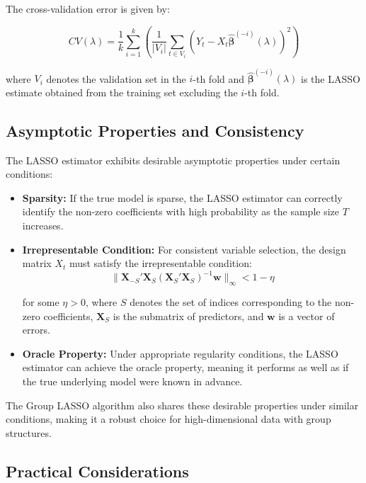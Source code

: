 \documentclass[11pt]{article}
\begin{document}
The cross-validation error is given by:

\begin{equation}
CV(\lambda) = \frac{1}{k} \sum_{i=1}^k \left( \frac{1}{|V_i|} \sum_{t \in V_i} \left( Y_t - X_t \hat{\boldsymbol{\beta}}^{(-i)}(\lambda) \right)^2 \right)
\end{equation}

where \(V_i\) denotes the validation set in the \(i\)-th fold and \(\hat{\boldsymbol{\beta}}^{(-i)}(\lambda)\) is the LASSO estimate obtained from the training set excluding the \(i\)-th fold.

\subsection{Asymptotic Properties and Consistency}

The LASSO estimator exhibits desirable asymptotic properties under certain conditions:
\begin{itemize}
    \item \textbf{Sparsity:} If the true model is sparse, the LASSO estimator can correctly identify the non-zero coefficients with high probability as the sample size \(T\) increases.
    \item \textbf{Irrepresentable Condition:} For consistent variable selection, the design matrix \(X_t\) must satisfy the irrepresentable condition:
    \begin{equation}
    \|\mathbf{X}_{-S}' \mathbf{X}_S (\mathbf{X}_S' \mathbf{X}_S)^{-1} \mathbf{w}\|_\infty < 1 - \eta
    \end{equation}

    for some \(\eta > 0\), where \(S\) denotes the set of indices corresponding to the non-zero coefficients, \(\mathbf{X}_S\) is the submatrix of predictors, and \(\mathbf{w}\) is a vector of errors.
    \item \textbf{Oracle Property:} Under appropriate regularity conditions, the LASSO estimator can achieve the oracle property, meaning it performs as well as if the true underlying model were known in advance.
\end{itemize}

The Group LASSO algorithm also shares these desirable properties under similar conditions, making it a robust choice for high-dimensional data with group structures.

\subsection{Practical Considerations}
\end{document}
